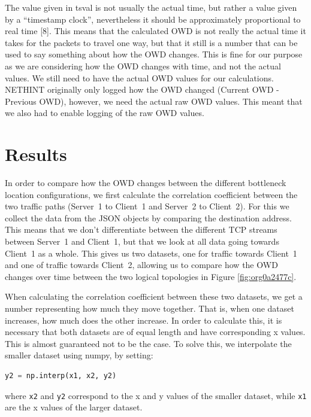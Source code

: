 \documentclass[a4paper,11pt]{article}
\makeatletter
\newcommand{\cslcitation}[2]
 {\protect\hyper@linkstart{cite}{citeproc_bib_item_#1}#2\hyper@linkend}
\makeatother
\begin{document}
The value given in tsval is not usually the actual time, but rather a value given by a ``timestamp clock'', nevertheless it should be approximately proportional to real time \cslcitation{8}{[8]}. This means that the calculated OWD is not really the actual time it takes for the packets to travel one way, but that it still is a number that can be used to say something about how the OWD changes. This is fine for our purpose as we are considering how the OWD changes with time, and not the actual values. We still need to have the actual OWD values for our calculations. NETHINT originally only logged how the OWD changed (Current OWD - Previous OWD), however, we need the actual raw OWD values. This meant that we also had to enable logging of the raw OWD values.
\section{Results}
\label{sec:orga97916c}
In order to compare how the OWD changes between the different bottleneck location configurations, we first calculate the correlation coefficient between the two traffic paths (Server~1 to Client~1 and Server~2 to Client~2). For this we collect the data from the JSON objects by comparing the destination address. This means that we don't differentiate between the different TCP streams between Server~1 and Client~1, but that we look at all data going towards Client~1 as a whole. This gives us two datasets, one for traffic towards Client~1 and one of traffic towards Client~2, allowing us to compare how the OWD changes over time between the two logical topologies in Figure \ref{fig:org0a2477c}.

When calculating the correlation coefficient between these two datasets, we get a number representing how much they move together. That is, when one dataset increases, how much does the other increase. In order to calculate this, it is necessary that both datasets are of equal length and have corresponding x values. This is almost guaranteed not to be the case. To solve this, we interpolate the smaller dataset using numpy, by setting:
\begin{lstlisting}[basicstyle=\ttfamily\footnotesize,breaklines=true,showstringspaces=false,postbreak=\mbox{$\hookrightarrow$\space},tabsize=2,language=Python,numbers=none]
y2 = np.interp(x1, x2, y2)
\end{lstlisting}
where \texttt{x2} and \texttt{y2} correspond to the x and y values of the smaller dataset, while \texttt{x1} are the x values of the larger dataset.
\end{document}
